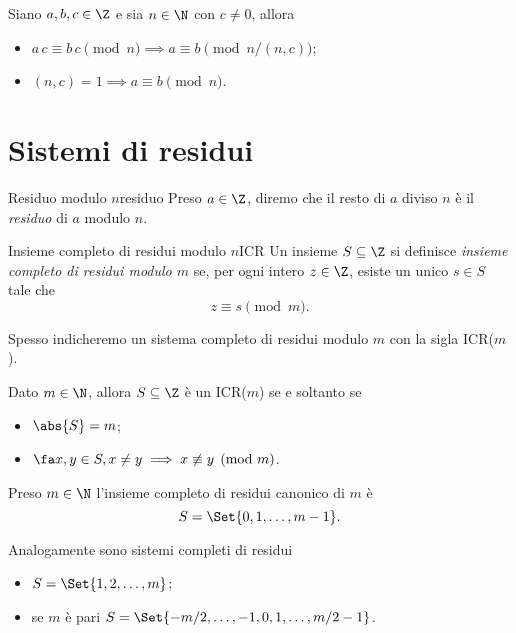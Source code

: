 \begin{pr}\label{th:3.3}
	Siano \(a,b,c\in\Z\) e sia \(n\in\N\) con \(c\neq 0\), allora
	\begin{itemize}
		\item \(a\,c\equiv b\,c \pmod{n} \implies a\equiv b \pmod{n/(n,c)}\);
		\item \((n,c)=1 \implies a\equiv b \pmod{n}\).
	\end{itemize}
\end{pr}
\section{Sistemi di residui}

\begin{defn}{Residuo modulo \(n\)}{residuo}
	Preso \(a\in\Z\), diremo che il resto di \(a\) diviso \(n\) è il \emph{residuo} di \(a\) modulo \(n\).
\end{defn}

\begin{defn}{Insieme completo di residui modulo \(n\)}{ICR}
	Un insieme \(S\subseteq\Z\) si definisce \emph{insieme completo di residui modulo \(m\)} se, per ogni intero \(z\in\Z\), esiste un unico \(s\in S\) tale che
	\[
		z\equiv s \pmod{m}.
	\]
\end{defn}

\begin{notz}
	Spesso indicheremo un sistema completo di residui modulo \(m\) con la sigla ICR(\(m\)).
\end{notz}

\begin{pr*}
	Dato \(m\in\N\), allora \(S\subseteq \Z\) è un ICR(\(m\)) se e soltanto se
	\begin{itemize}
		\item \(\abs{S} = m\);
		\item \(\fa x,y \in S, x\neq y \implies x \not\equiv y \pmod{m}\).
	\end{itemize}
\end{pr*}

\begin{ese}
	Preso \(m\in\N\) l'insieme completo di residui canonico di \(m\) è
	\[
		S=\Set{0,1,\ldots,m-1}.
	\]
\end{ese}

\begin{ese}
	Analogamente sono sistemi completi di residui
	\begin{itemize}
		\item \(S=\Set{1,2,\ldots,m}\);
		\item se \(m\) è pari \(S=\Set{-m/2,\ldots,-1,0,1,\ldots,m/2-1}\).
	\end{itemize}
\end{ese}

